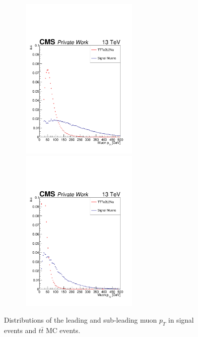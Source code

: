 \documentclass{cernatlasnote}
\begin{document}
        \begin{figure}[ht]
\centering
\includegraphics[height=8cm, width=8cm, trim= 0cm 0cm 0cm 0.cm,clip]{images/Muon/MuonLeadingPt.pdf}\includegraphics[height=8cm, width=8cm, trim= 0cm 0cm 0cm 0.cm,clip]{images/Muon/MuonLeadingPt2.pdf}
\caption{\label{fig:MuonPt} Distributions of the leading and sub-leading muon $p_T$ in signal events and $t\bar{t}$ MC events.}
\end{figure}
\FloatBarrier
\end{document}
